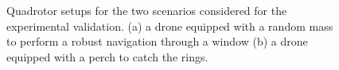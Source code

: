 \begin{figure} [h]
    \centering
    
    
    \caption{Quadrotor setups for the two scenarios considered for the experimental validation. (a) a drone equipped with a random mass to perform a robust navigation through a window (b) a drone equipped with a perch to catch the rings.}%
    \label{fig: exp setup}%
\end{figure}

